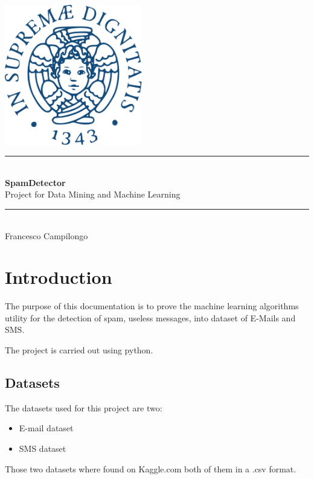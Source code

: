 \documentclass[a4paper]{report}
\newcommand{\HRule}{\rule{\linewidth}{0.5mm}}
\begin{document}
	\begin{titlepage}
		\begin{center}
			
			\includegraphics[width=0.45\textwidth]{img/unipi.png}~\\[2.5cm]
			
			
			\HRule \\[0.4cm]
			{ \LARGE 
				\textbf{SpamDetector}\\[0.4cm]
				{Project for Data Mining and Machine Learning}\\[0.4cm]
			}
			\HRule \\[1.5cm]
			
			
			
			{ \large
				Francesco Campilongo \\[0.1cm]
			}
			
			\vfill
			
		\end{center}
	\end{titlepage}

\tableofcontents
\chapter{Introduction}
The purpose of this documentation is to prove the machine learning algorithms utility for the detection of spam, useless messages, into dataset of E-Mails and SMS.

\noindent The project is carried out using python.
\section{Datasets}
The datasets used for this project are two:
\begin{itemize}
	\item E-mail dataset
	\item SMS dataset
\end{itemize}
Those two datasets where found on Kaggle.com both of them in a .csv format.
\end{document}
